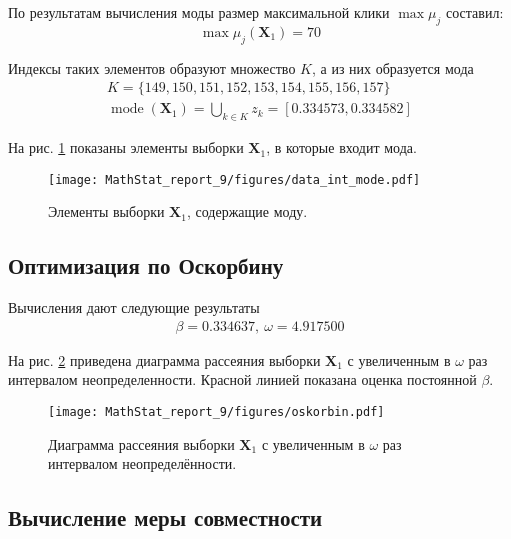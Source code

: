 \documentclass[12pt]{article}
\DeclareMathOperator{\mode}{mode}
\begin{document}
	По результатам вычисления моды размер максимальной клики $\max \mu_j$ составил:
	\begin{equation*}
		\max \mu_j(\mathbf{X}_1)=70
	\end{equation*}
	
	Индексы таких элементов образуют множество $K$, а из них образуется мода
	\begin{equation*}
		\begin{gathered}
			K = \{149, 150, 151, 152, 153, 154, 155, 156, 157\}\\
			\mode (\mathbf{X}_1) = \bigcup\limits_{k\in K}z_k = [0.334573, 0.334582]
		\end{gathered}
	\end{equation*}
	
	На рис. \ref{fig:mode_int} показаны элементы выборки $\mathbf{X}_1$, в которые входит мода.
	\begin{figure}[H]
		\centering\texttt{[image: MathStat\_report\_9/figures/data\_int\_mode.pdf]}
		\caption{Элементы выборки $\mathbf{X}_1$, содержащие моду.}
		\label{fig:mode_int}
	\end{figure}
	
	\subsection{Оптимизация по Оскорбину}
	
	Вычисления дают следующие результаты
	\begin{equation*}
		\begin{gathered}
			\beta = 0.334637,\ 
			\omega = 4.917500
		\end{gathered}
	\end{equation*}
	
	На рис. \ref{fig:oskorbin} приведена диаграмма рассеяния выборки $\mathbf{X}_1$ с увеличенным в $\omega$ раз интервалом неопределенности. Красной линией показана оценка постоянной $\beta$.
	
	\begin{figure}[H]
		\centering\texttt{[image: MathStat\_report\_9/figures/oskorbin.pdf]}
		\caption{Диаграмма рассеяния выборки $\mathbf{X}_1$ с увеличенным в $\omega$ раз интервалом неопределённости.}
		\label{fig:oskorbin}
	\end{figure}
	
	\subsection{Вычисление меры совместности}
	
\end{document}
